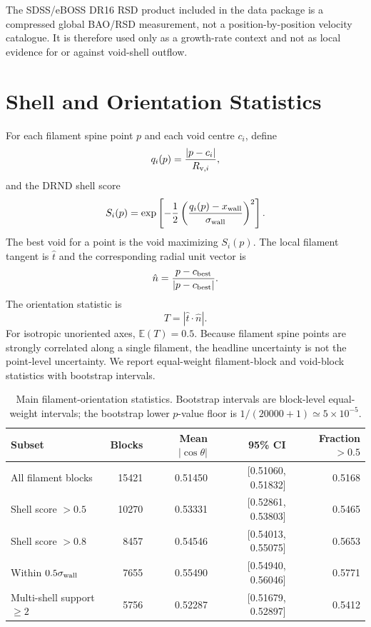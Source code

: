 \documentclass[11pt,a4paper]{article}
\begin{document}
The SDSS/eBOSS DR16 RSD product included in the data package is a compressed global BAO/RSD measurement, not a position-by-position velocity catalogue. It is therefore used only as a growth-rate context and not as local evidence for or against void-shell outflow.

\section{Shell and Orientation Statistics}

For each filament spine point $p$ and each void centre $c_i$, define
\begin{equation}
q_i(p)=\frac{|p-c_i|}{R_{{\rm v},i}},
\end{equation}
and the DRND shell score
\begin{equation}
S_i(p)=\exp\left[-\frac{1}{2}\left(\frac{q_i(p)-x_{\rm wall}}{\sigma_{\rm wall}}\right)^2\right].
\end{equation}
The best void for a point is the void maximizing $S_i(p)$. The local filament tangent is $\hat{t}$ and the corresponding radial unit vector is
\begin{equation}
\hat{n}=\frac{p-c_{\rm best}}{|p-c_{\rm best}|}.
\end{equation}
The orientation statistic is
\begin{equation}
T=|\hat{t}\cdot\hat{n}|.
\end{equation}
For isotropic unoriented axes, $\mathbb{E}(T)=0.5$. Because filament spine points are strongly correlated along a single filament, the headline uncertainty is not the point-level uncertainty. We report equal-weight filament-block and void-block statistics with bootstrap intervals.

\begin{table}[H]
\centering
\caption{Main filament-orientation statistics. Bootstrap intervals are block-level equal-weight intervals; the bootstrap lower $p$-value floor is $1/(20000+1)\simeq5\times10^{-5}$.}
\begin{tabular}{lrrrr}
\toprule
Subset & Blocks & Mean $|\cos\theta|$ & 95\% CI & Fraction $>0.5$ \\
\midrule
All filament blocks & 15421 & 0.51450 & [0.51060, 0.51832] & 0.5168 \\
Shell score $>0.5$ & 10270 & 0.53331 & [0.52861, 0.53803] & 0.5465 \\
Shell score $>0.8$ & 8457 & 0.54546 & [0.54013, 0.55075] & 0.5653 \\
Within $0.5\sigma_{\rm wall}$ & 7655 & 0.55490 & [0.54940, 0.56046] & 0.5771 \\
Multi-shell support $\geq2$ & 5756 & 0.52287 & [0.51679, 0.52897] & 0.5412 \\
\bottomrule
\end{tabular}
\end{table}
\end{document}
